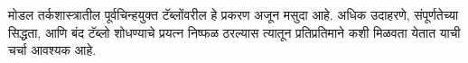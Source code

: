 \documentclass[../../../include/open-logic-chapter]{subfiles}
\begin{document}

\begin{editorial}
  मोडल तर्कशास्त्रातील पूर्वचिन्हयुक्त टॅब्लोंवरील
  हे प्रकरण अजून मसुदा आहे. अधिक उदाहरणे,
  संपूर्णतेच्या सिद्धता, आणि बंद टॅब्लो शोधण्याचे
  प्रयत्न निष्फळ ठरल्यास त्यातून प्रतिप्रतिमाने
  कशी मिळवता येतात याची चर्चा आवश्यक आहे.
\end{editorial}


\OLEndChapterHook
\end{document}

